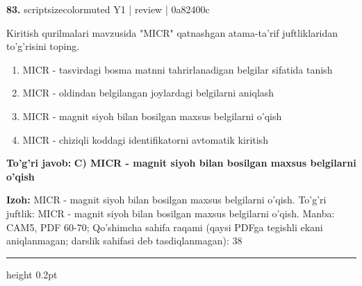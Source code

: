 \documentclass[10pt,a4paper]{article}
\begin{document}
{\bfseries\sffamily\color{ink} 83.} {scriptsizecolor{muted} Y1 | review | 0a82400c}
\par
Kiritish qurilmalari mavzusida "MICR" qatnashgan atama-ta'rif juftliklaridan to'g'risini toping.
\begin{enumerate}[label=\Alph*),leftmargin=9mm]
\item MICR - tasvirdagi bosma matnni tahrirlanadigan belgilar sifatida tanish
\item MICR - oldindan belgilangan joylardagi belgilarni aniqlash
\item MICR - magnit siyoh bilan bosilgan maxsus belgilarni o'qish
\item MICR - chiziqli koddagi identifikatorni avtomatik kiritish
\end{enumerate}
\begin{tcolorbox}[enhanced,breakable,colback=teal!4,colframe=teal!60!black,boxrule=0.45pt,arc=1.2mm,left=2.7mm,right=2.7mm,top=1.8mm,bottom=1.8mm,before skip=2mm,after skip=2mm]
{\bfseries\sffamily\color{teal}To'g'ri javob:} \textbf{C) MICR - magnit siyoh bilan bosilgan maxsus belgilarni o'qish}
\par\smallskip
{\bfseries Izoh:} MICR - magnit siyoh bilan bosilgan maxsus belgilarni o'qish. To'g'ri juftlik: MICR - magnit siyoh bilan bosilgan maxsus belgilarni o'qish. Manba: CAM5, PDF 60-70; Qo'shimcha sahifa raqami (qaysi PDFga tegishli ekani aniqlanmagan; darslik sahifasi deb tasdiqlanmagan): 38
\end{tcolorbox}
\vspace{2mm}\hrule height 0.2pt\vspace{3mm}
\end{document}
